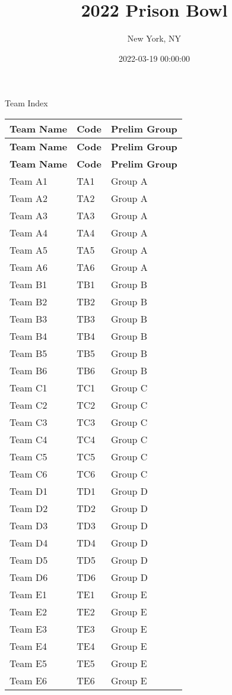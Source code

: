 \documentclass{article}%
\title{2022 Prison Bowl}%
\author{New York, NY}%
\date{2022{-}03{-}19 00:00:00}%
\begin{document}
%
\normalsize%
%
\maketitle%
\vspace*{48pt}%
\begin{center}%
\begin{Huge}%
Team Index%
\end{Huge}%
\end{center}%
\newpage%
%
%
\begin{longtable}{|ll|l|}%
\rowcolor{gray!30}%
\hline%
\textbf{Team Name} & \textbf{Code}&\textbf{Prelim Group}\\%
\hline%
\endhead%
\hline%
\rowcolor{gray!25}%
\textbf{Team Name} & \textbf{Code}&\textbf{Prelim Group}\\%
\hline%
\endfoot%
\hline%
\hline\rowcolor{gray!25}%
\textbf{Team Name} & \textbf{Code}&\textbf{Prelim Group}\\%
\hline%
\endlastfoot%
\hline%
Team A1&TA1&Group A\\%
Team A2&TA2&Group A\\%
Team A3&TA3&Group A\\%
Team A4&TA4&Group A\\%
Team A5&TA5&Group A\\%
Team A6&TA6&Group A\\%
Team B1&TB1&Group B\\%
Team B2&TB2&Group B\\%
Team B3&TB3&Group B\\%
Team B4&TB4&Group B\\%
Team B5&TB5&Group B\\%
Team B6&TB6&Group B\\%
Team C1&TC1&Group C\\%
Team C2&TC2&Group C\\%
Team C3&TC3&Group C\\%
Team C4&TC4&Group C\\%
Team C5&TC5&Group C\\%
Team C6&TC6&Group C\\%
Team D1&TD1&Group D\\%
Team D2&TD2&Group D\\%
Team D3&TD3&Group D\\%
Team D4&TD4&Group D\\%
Team D5&TD5&Group D\\%
Team D6&TD6&Group D\\%
Team E1&TE1&Group E\\%
Team E2&TE2&Group E\\%
Team E3&TE3&Group E\\%
Team E4&TE4&Group E\\%
Team E5&TE5&Group E\\%
Team E6&TE6&Group E\\%
\end{longtable}%
\end{document}
